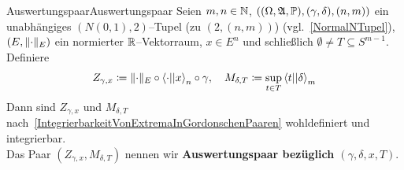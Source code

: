 \begin{defsatz}{Auswertungspaar}{Auswertungspaar}
Seien $m,n \in \mathbb{N}$, $((\Omega, \mathfrak{A}, \mathbb{P}), (\gamma,\delta), (n,m))$
ein unabhängiges $(N(0,1), 2)$--Tupel (zu $(2, (n,m))$)
(vgl.~\ref{NormalNTupel}), $(E, \lVert\cdot\rVert_E)$ ein normierter
$\mathbb{R}$--Vektorraum, $x \in E^n$ und schließlich 
$\emptyset \neq T \subseteq S^{m-1}$.\\
Definiere
\[Z_{\gamma, x}\coloneqq  \lVert\cdot\rVert_E \circ \left\langle \cdot ||x\right\rangle_n \circ \gamma,\quad
  M_{\delta, T}\coloneqq  \sup_{t \in T}\left\langle t ||\delta\right\rangle_m\]
Dann sind $Z_{\gamma, x}$ und $M_{\delta, T}$ nach~\ref{IntegrierbarkeitVonExtremaInGordonschenPaaren} wohldefiniert und
integrierbar.\\
Das Paar $(Z_{\gamma, x}, M_{\delta, T})$ nennen wir
\textbf{Auswertungspaar bezüglich $(\gamma, \delta, x, T)$}.
\end{defsatz}